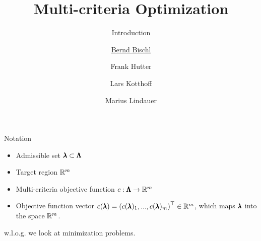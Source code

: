 

\newcommand{\xx}{\conf} %
\newcommand{\xxi}[1][i]{\lambda_{#1}} %
\newcommand{\XX}{\pcs} %
\newcommand{\f}{\cost} %
\newcommand{\yy}{\cost} %

\title[AutoML: Overview]{Multi-criteria Optimization}
\subtitle{Introduction}
\author[Bernd Bischl]{\underline{Bernd Bischl} \and Frank Hutter \and Lars Kotthoff \and Marius Lindauer}
\institute{}
\date{}






	\maketitle


\begin{frame}{Notation}

\begin{itemize}
\item Admissible set $\pmb{\lambda} \subset \pmb{\Lambda}$
\item Target region $\mathbb{R}^m$
\item Multi-criteria objective function $c: \pmb{\Lambda} \to \mathbb{R}^m$
\item Objective function vector $c(\pmb{\lambda}) = \left(c(\pmb{\lambda})_1, ..., c(\pmb{\lambda})_m\right)^\top \in \mathbb{R}^m$, which maps $\pmb{\lambda}$ into the space $\mathbb{R}^m$.
\end{itemize}

w.l.o.g. we look at minimization problems.

\end{frame}

